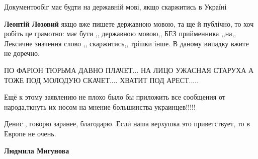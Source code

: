 \begin{itemize}
Документообіг має будти на державній мові, якщо скаржитись в Україні

\begin{itemize}
 
\textbf{Леонтій Лозовий} якщо вже пишете державною мовою, та ще й публічно, то
хоч робіть це грамотно: має бути ,, державною мовою,, БЕЗ прийменника ,,на,,
Лексичне значення слово ,, скаржитись,, трішки інше. В даному випадку вжите не
доречно.
\end{itemize}

 
ПО ФАРІОН ТЮРЬМА ДАВНО ПЛАЧЕТ... НА ЛИЦО УЖАСНАЯ СТАРУХА А ТОЖЕ ПОД МОЛОДУЮ
СКАЧЕТ.... ХВАТИТ ПОД АРЕСТ.....

 

Ещё к этому заявлению не плохо было бы приложить все сообщения от народа,ткнуть
их носом на мнение большинства украинцев!!!!!

 
Денис , говорю заранее, благодарю. Если наша верхушка это приветствует, то в Европе не очень.

\begin{itemize}
 
\textbf{Людмила Мигунова} 


\end{itemize}
\end{itemize}
